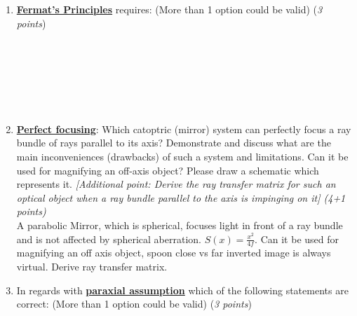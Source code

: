 \documentclass[main.tex]{subfiles}
\begin{document}
\begin{enumerate}


\item \textbf{\underline{Fermat's Principles}} requires: (More than 1 option could be valid) (\textit{3 points}) \\
\bigcirc {}\\
\bigcirc {}\\
\bigcirc {}\\
\bigcirc {}\\
\bigcirc {}\\
\bigcirc {}\\


\item \textbf{\underline{Perfect focusing}}: Which catoptric (mirror) system can perfectly focus a ray bundle of rays parallel to its axis? Demonstrate and discuss what are the main inconveniences (drawbacks) of such a system and limitations. Can it be used for magnifying an off-axis object? Please draw a schematic which represents it.  \textit{[Additional point: Derive the ray transfer matrix for such an optical object when a ray bundle parallel to the axis is impinging on it] (4+1 points)} \\

A parabolic Mirror, which is spherical, focuses light in front of a ray bundle and is not affected by spherical aberration. $S(x) = \frac{x^2}{4f}$. Can it be used for magnifying an off axis object, spoon close vs far inverted image is always virtual. Derive ray transfer matrix.


\item In regards with \textbf{\underline{paraxial assumption}} which of the following statements are correct: (More than 1 option could be valid) (\textit{3 points}) \\
\bigcirc {}\\
\bigcirc {}\\
\bigcirc {}\\
\bigcirc {}\\
\bigcirc  {} \\ 


\end{enumerate}
\end{document}
